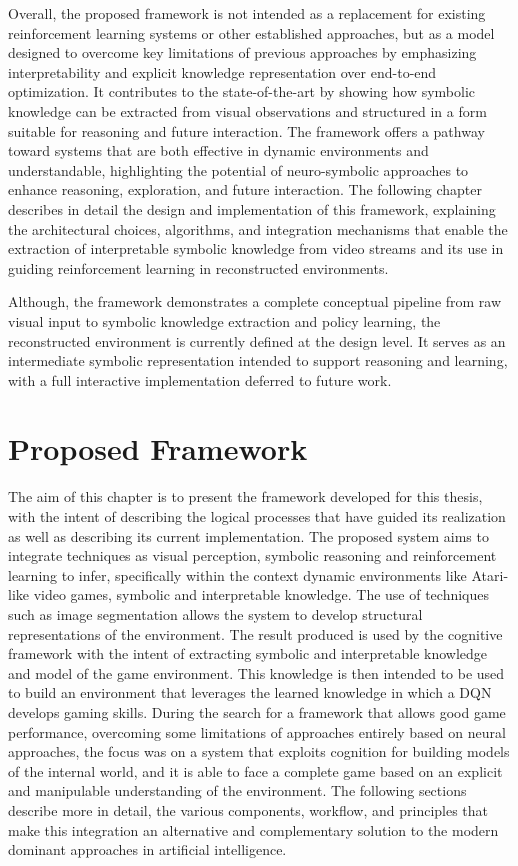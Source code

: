 \documentclass[12pt,a4paper]{report}
\begin{document}
Overall, the proposed framework is not intended as a replacement for existing reinforcement learning systems or other established approaches, but as a model designed to overcome key limitations of previous approaches by emphasizing interpretability and explicit knowledge representation over end-to-end optimization. It contributes to the state-of-the-art by showing how symbolic knowledge can be extracted from visual observations and structured in a form suitable for reasoning and future interaction. The framework offers a pathway toward systems that are both effective in dynamic environments and understandable, highlighting the potential of neuro-symbolic approaches to enhance reasoning, exploration, and future interaction.
The following chapter describes in detail the design and implementation of this framework, explaining the architectural choices, algorithms, and integration mechanisms that enable the extraction of interpretable symbolic knowledge from video streams and its use in guiding reinforcement learning in reconstructed environments.

Although, the framework demonstrates a complete conceptual pipeline from raw visual input to symbolic knowledge extraction and policy learning, the reconstructed environment is currently defined at the design level. It serves as an intermediate symbolic representation intended to support reasoning and learning, with a full interactive implementation deferred to future work.



\chapter{Proposed Framework}

The aim of this chapter is to present the framework developed for this thesis, with the intent of describing the logical processes that have guided its realization as well as describing its current implementation. The proposed system aims to integrate techniques as visual perception, symbolic reasoning and reinforcement learning to infer, specifically within the context dynamic environments like Atari-like video games, symbolic and interpretable knowledge.
The use of techniques such as image segmentation allows the system to develop structural representations of the environment. The result produced is used by the cognitive framework with the intent of extracting symbolic and interpretable knowledge and model of the game environment. This knowledge is then intended to be used to build an environment that leverages the learned knowledge in which a DQN develops gaming skills.
During the search for a framework that allows good game performance, overcoming some limitations of approaches entirely based on neural approaches, the focus was on a system that exploits cognition for building models of the internal world, and it is able to face a complete game based on an explicit and manipulable understanding of the environment.
The following sections describe more in detail, the various components, workflow, and principles that make this integration an alternative and complementary solution to the modern dominant approaches in artificial intelligence.
\end{document}
